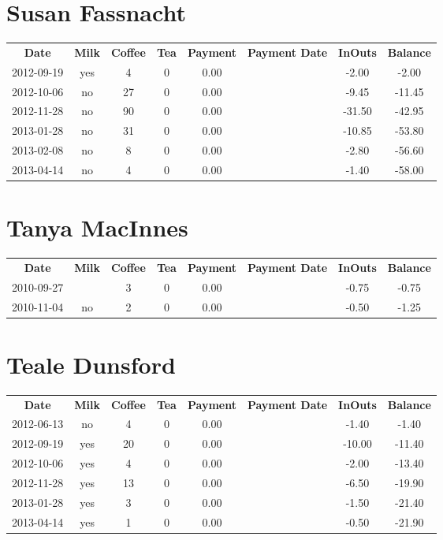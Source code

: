 \section{Susan Fassnacht}

\begin{center}
\begin{tabular}{cccccccc}
\textbf{Date} & \textbf{Milk} & \textbf{Coffee} & \textbf{Tea} & \textbf{Payment} & \textbf{Payment Date} & \textbf{InOuts} & \textbf{Balance} \\
2012-09-19 & yes &  4 & 0 & 0.00 &  &  -2.00 &  -2.00\\ 
2012-10-06 & no & 27 & 0 & 0.00 &  &  -9.45 & -11.45\\ 
2012-11-28 & no & 90 & 0 & 0.00 &  & -31.50 & -42.95\\ 
2013-01-28 & no & 31 & 0 & 0.00 &  & -10.85 & -53.80\\ 
2013-02-08 & no &  8 & 0 & 0.00 &  &  -2.80 & -56.60\\ 
2013-04-14 & no &  4 & 0 & 0.00 &  &  -1.40 & -58.00
\end{tabular}
\end{center}

\section{Tanya MacInnes}

\begin{center}
\begin{tabular}{cccccccc}
\textbf{Date} & \textbf{Milk} & \textbf{Coffee} & \textbf{Tea} & \textbf{Payment} & \textbf{Payment Date} & \textbf{InOuts} & \textbf{Balance} \\
2010-09-27 &  & 3 & 0 & 0.00 &  & -0.75 & -0.75\\ 
2010-11-04 & no & 2 & 0 & 0.00 &  & -0.50 & -1.25
\end{tabular}
\end{center}

\section{Teale Dunsford}

\begin{center}
\begin{tabular}{cccccccc}
\textbf{Date} & \textbf{Milk} & \textbf{Coffee} & \textbf{Tea} & \textbf{Payment} & \textbf{Payment Date} & \textbf{InOuts} & \textbf{Balance} \\
2012-06-13 & no &  4 & 0 & 0.00 &  &  -1.40 &  -1.40\\ 
2012-09-19 & yes & 20 & 0 & 0.00 &  & -10.00 & -11.40\\ 
2012-10-06 & yes &  4 & 0 & 0.00 &  &  -2.00 & -13.40\\ 
2012-11-28 & yes & 13 & 0 & 0.00 &  &  -6.50 & -19.90\\ 
2013-01-28 & yes &  3 & 0 & 0.00 &  &  -1.50 & -21.40\\ 
2013-04-14 & yes &  1 & 0 & 0.00 &  &  -0.50 & -21.90
\end{tabular}
\end{center}

